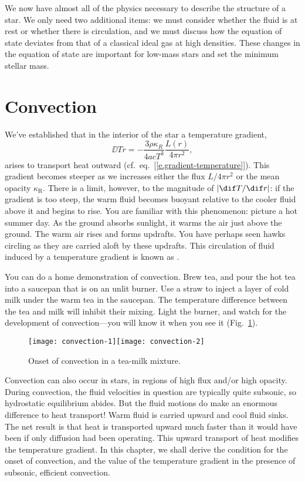 
We now have almost all of the physics necessary to describe the structure of a star. We only need two additional items: we must consider whether the fluid is at rest or whether there is circulation, and we must discuss how the equation of state deviates from that of a classical ideal gas at high densities. These changes in the equation of state are important for low-mass stars and set the minimum stellar mass.

\section{Convection}\label{s.convection}

We've established that in the interior of the star a temperature gradient,
\[
	\DD{T}{r} = -\frac{3\rho\kappa_{R}}{4acT^3}\frac{L(r)}{4\pi r^2},
\]
arises to transport heat outward (cf.\ eq.~[\ref{e.gradient-temperature}]).
This gradient becomes steeper as we increases either the flux $L/4\pi r^{2}$ or the mean opacity $\kappa_{\mathrm{R}}$. There is a limit, however, to the magnitude of $|\dif T/\dif r|$: if the gradient is too steep, the warm fluid becomes buoyant relative to the cooler fluid above it and begins to rise. You are familiar with this phenomenon: picture a hot summer day. As the ground absorbs sunlight, it warms the air just above the ground. The warm air rises and forms updrafts. You have perhaps seen hawks circling as they are carried aloft by these updrafts. This circulation of fluid induced by a temperature gradient is known as . 

You can do a home demonstration of convection.  Brew tea, and pour the hot tea into a saucepan that is on an unlit burner. Use a straw to inject a layer of cold milk under the warm tea in the saucepan. The temperature difference between the tea and milk will inhibit their mixing. Light the burner, and watch for the development of convection---you will know it when you see it (Fig.~\ref{f.tea}).

\begin{figure}[htbp]
\forceversofloat
\texttt{[image: convection-1]}\texttt{[image: convection-2]}
\caption[Onset of convection]{Onset of convection in a tea-milk mixture.\label{f.tea}}
\end{figure}

Convection can also occur in stars, in regions of high flux and/or high opacity. During convection, the fluid velocities in question are typically quite subsonic, so hydrostatic equilibrium abides. But the fluid motions do make an enormous difference to heat transport! Warm fluid is carried upward and cool fluid sinks. The net result is that heat is transported upward much faster than it would have been if only diffusion had been operating. This upward transport of heat modifies the temperature gradient. In this chapter, we shall derive the condition for the onset of convection, and the value of the temperature gradient in the presence of subsonic, efficient convection.

